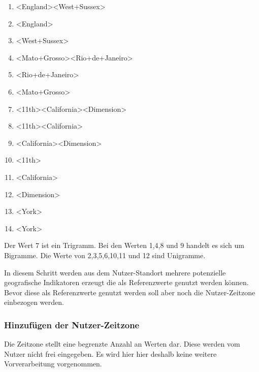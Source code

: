 				\begin{multicols}{2}
					\begin{enumerate}
						\item \textless England\textgreater   \textless West+Sussex\textgreater  
						\item \textless England\textgreater  
						\item \textless West+Sussex\textgreater  
						\item \textless Mato+Grosso\textgreater   \textless Rio+de+Janeiro\textgreater  
						\item \textless Rio+de+Janeiro\textgreater  
						\item \textless Mato+Grosso\textgreater  
						\item \textless 11th\textgreater   \textless California\textgreater   \textless Dimension\textgreater   
						\item \textless 11th\textgreater   \textless California\textgreater  
						\item \textless California\textgreater   \textless Dimension\textgreater   
						\item \textless 11th\textgreater  
						\item \textless California\textgreater  
						\item \textless Dimension\textgreater   
						\item \textless York\textgreater  
						\item \textless York\textgreater  
					\end{enumerate}
				\end{multicols}
				Der Wert 7 ist ein Trigramm.
				Bei den Werten 1,4,8 und 9 handelt es sich um Bigramme. 
				Die Werte von 2,3,5,6,10,11 und 12 sind Unigramme.				

				In diesem Schritt werden aus dem Nutzer-Standort mehrere potenzielle geografische Indikatoren erzeugt die als Referenzwerte genutzt werden können.
				Bevor diese als Referenzwerte genutzt werden soll aber noch die Nutzer-Zeitzone einbezogen werden.

			\subsubsection{Hinzufügen der Nutzer-Zeitzone}

				Die Zeitzone stellt eine begrenzte Anzahl an Werten dar.
				Diese werden vom Nutzer nicht frei eingegeben. 
				Es wird hier hier deshalb keine weitere Vorverarbeitung vorgenommen.


